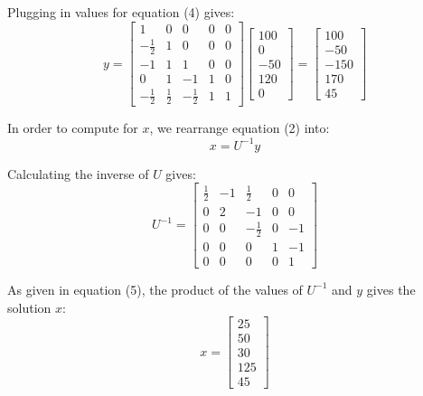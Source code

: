 \documentclass[paper.tex]{subfiles}
\begin{document}
Plugging in values for equation (4) gives:
\begin{equation*}
    y = \begin{bmatrix}
        1 & 0 & 0 & 0 & 0 \\
        -\frac{1}{2} & 1 & 0 & 0 & 0 \\
        -1 & 1 & 1 & 0 & 0 \\
        0 & 1 & -1 & 1 & 0 \\
        -\frac{1}{2} & \frac{1}{2} & -\frac{1}{2} & 1 & 1
    \end{bmatrix}
    \begin{bmatrix}
        100 \\
        0 \\
        -50 \\
        120 \\
        0
    \end{bmatrix}
    =\begin{bmatrix}
        100 \\
        -50 \\
        -150 \\
        170 \\
        45 
    \end{bmatrix}
\end{equation*}

In order to compute for $x$, we rearrange equation (2) into:
\begin{equation}
    x = U^{-1}y
\end{equation}

Calculating the inverse of $U$ gives:
\begin{equation*}
    U^{-1}=\begin{bmatrix}
        \frac{1}{2} & -1 & \frac{1}{2} & 0 & 0 \\
        0 & 2 & -1 & 0 & 0 \\
        0 & 0 & -\frac{1}{2} & 0 & -1 \\
        0 & 0 & 0 & 1 & -1 \\
        0 & 0 & 0 & 0 & 1 
    \end{bmatrix}
\end{equation*}

As given in equation (5), the product of the values of $U^{-1}$ and $y$ gives the solution $x$:
\begin{equation*}
    x = \begin{bmatrix}
        25 \\
        50 \\ 
        30 \\ 
        125 \\
        45
    \end{bmatrix}
\end{equation*}
\end{document}
